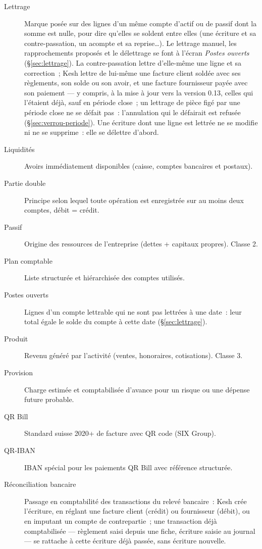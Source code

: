 \documentclass[a4paper,11pt,oneside]{article}
\begin{document}
\begin{description}
    \item[Lettrage] Marque posée sur des lignes d'un même compte d'actif ou de passif dont la
          somme est nulle, pour dire qu'elles se soldent entre elles (une écriture et sa
          contre-passation, un acompte et sa reprise\ldots). Le lettrage manuel, les
          rapprochements proposés et le délettrage se font à l'écran \emph{Postes ouverts}
          (\S\ref{sec:lettrage}). La contre-passation lettre d'elle-même une ligne et sa correction~; Kesh lettre de
          lui-même une facture client soldée avec ses règlements, son solde ou son avoir, et une
          facture fournisseur payée avec son paiement --- y compris, à la mise à jour vers la
          version 0.13, celles qui l'étaient déjà, sauf en période close~; un
          lettrage de pièce figé par une période close ne se défait pas~: l'annulation qui le
          défairait est refusée (\S\ref{sec:verrou-periode}). Une écriture dont une
          ligne est lettrée ne se modifie ni ne se supprime~: elle se délettre d'abord.
    \item[Liquidités] Avoirs immédiatement disponibles (caisse, comptes bancaires et postaux).
    \item[Partie double] Principe selon lequel toute opération est enregistrée sur au moins deux comptes, débit = crédit.
    \item[Passif] Origine des ressources de l'entreprise (dettes + capitaux propres). Classe 2.
    \item[Plan comptable] Liste structurée et hiérarchisée des comptes utilisés.
    \item[Postes ouverts] Lignes d'un compte lettrable qui ne sont pas lettrées à une date~: leur total égale le solde du compte à cette date (\S\ref{sec:lettrage}).
    \item[Produit] Revenu généré par l'activité (ventes, honoraires, cotisations). Classe 3.
    \item[Provision] Charge estimée et comptabilisée d'avance pour un risque ou une dépense future probable.
    \item[QR Bill] Standard suisse 2020+ de facture avec QR code (SIX Group).
    \item[QR-IBAN] IBAN spécial pour les paiements QR Bill avec référence structurée.
    \item[Réconciliation bancaire] Passage en comptabilité des transactions du relevé bancaire~: Kesh crée l'écriture, en réglant une facture client (crédit) ou fournisseur (débit), ou en imputant un compte de contrepartie~; une transaction déjà comptabilisée --- règlement saisi depuis une fiche, écriture saisie au journal --- se rattache à cette écriture déjà passée, sans écriture nouvelle.

\end{description}
\end{document}
